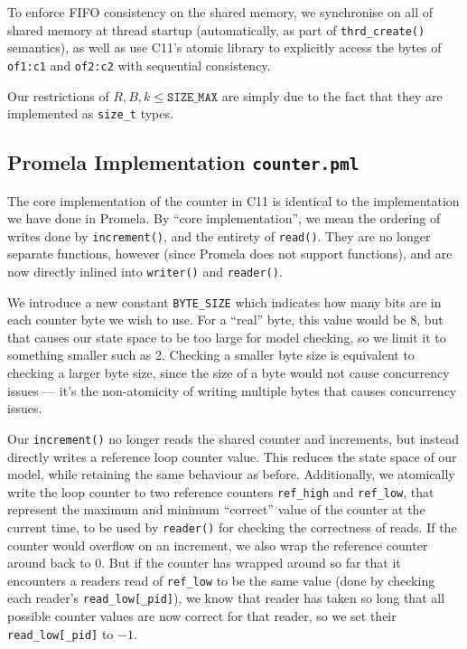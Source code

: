 \documentclass[a4paper]{scrartcl}
\begin{document}
To enforce FIFO consistency on the shared memory, we synchronise on all of shared memory at thread startup (automatically, as part of \texttt{thrd\_create()} semantics), as well as use C11's atomic library to explicitly access the bytes of \texttt{of1:c1} and \texttt{of2:c2} with sequential consistency.

Our restrictions of \(R, B, k \le \texttt{SIZE\_MAX}\) are simply due to the fact that they are implemented as \texttt{size\_t} types.

\subsection{Promela Implementation \texttt{counter.pml}}
The core implementation of the counter in C11 is identical to the implementation we have done in Promela. By ``core implementation'', we mean the ordering of writes done by \texttt{increment()}, and the entirety of \texttt{read()}. They are no longer separate functions, however (since Promela does not support functions), and are now directly inlined into \texttt{writer()} and \texttt{reader()}.

We introduce a new constant \texttt{BYTE\_SIZE} which indicates how many bits are in each counter byte we wish to use. For a ``real'' byte, this value would be 8, but that causes our state space to be too large for model checking, so we limit it to something smaller such as 2. Checking a smaller byte size is equivalent to checking a larger byte size, since the size of a byte would not cause concurrency issues --- it's the non-atomicity of writing multiple bytes that causes concurrency issues.

Our \texttt{increment()} no longer reads the shared counter and increments, but instead directly writes a reference loop counter value. This reduces the state space of our model, while retaining the same behaviour as before. Additionally, we atomically write the loop counter to two reference counters \texttt{ref\_high} and \texttt{ref\_low}, that represent the maximum and minimum ``correct'' value of the counter at the current time, to be used by \texttt{reader()} for checking the correctness of reads. If the counter would overflow on an increment, we also wrap the reference counter around back to 0. But if the counter has wrapped around so far that it encounters a readers read of \texttt{ref\_low} to be the same value (done by checking each reader's \texttt{read\_low[\_pid]}), we know that reader has taken so long that all possible counter values are now correct for that reader, so we set their \texttt{read\_low[\_pid]} to \(-1\).
\end{document}
